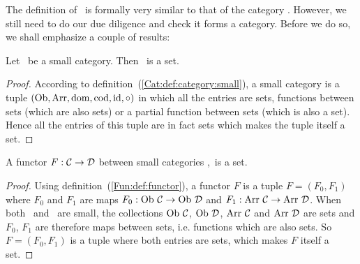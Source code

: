 The definition of \cat\ is formally very similar to that of the category \Set.
However, we still need to do our due diligence and check it forms a category.
Before we do so, we shall emphasize a couple of results:

\begin{prop}\label{Fun:prop:a:small:cat:is:a:set}
    Let \Cat\ be a small category. Then \Cat\ is a set.
\end{prop}
\begin{proof}
    According to definition~(\ref{Cat:def:category:small}), a small category
    is a tuple $(\mbox{\rm Ob}, \mbox{\rm Arr}, \mbox{\rm dom}, \mbox{\rm cod}, \mbox{\rm id}, \circ)$ in which all the entries
    are sets, functions between sets (which are also sets) or a partial function
    between sets (which is also a set). Hence all the entries of this tuple
    are in fact sets which makes the tuple itself a set.
\end{proof}

\begin{prop}\label{Fun:prop:a:small:functor:is:a:set}
    A functor $F:\mbox{$\cal C$}\to\mbox{$\cal D$}$ between small categories \Cat,\Dat\ is a set.
\end{prop}
\begin{proof}
    Using definition~(\ref{Fun:def:functor}), a functor $F$ is a tuple
    $F=(F_{0},F_{1})$ where $F_{0}$ and $F_{1}$ are maps
    $F_{0}:\mbox{\rm Ob}\ \mbox{$\cal C$}\to\mbox{\rm Ob}\ \mbox{$\cal D$}$ and $F_{1}:\mbox{\rm Arr}\ \mbox{$\cal C$}\to\mbox{\rm Arr}\ \mbox{$\cal D$}$.
    When both \Cat\ and \Dat\ are small, the collections $\mbox{\rm Ob}\ \mbox{$\cal C$}$,
    $\ob\ \Dat$, $\mbox{\rm Arr}\ \mbox{$\cal C$}$ and $\mbox{\rm Arr}\ \mbox{$\cal D$}$ are sets and $F_{0}$, $F_{1}$
    are therefore maps between sets, i.e. functions which are also sets.
    So $F=(F_{0},F_{1})$ is a tuple where both entries are sets, which makes
    $F$ itself a set.
\end{proof}


